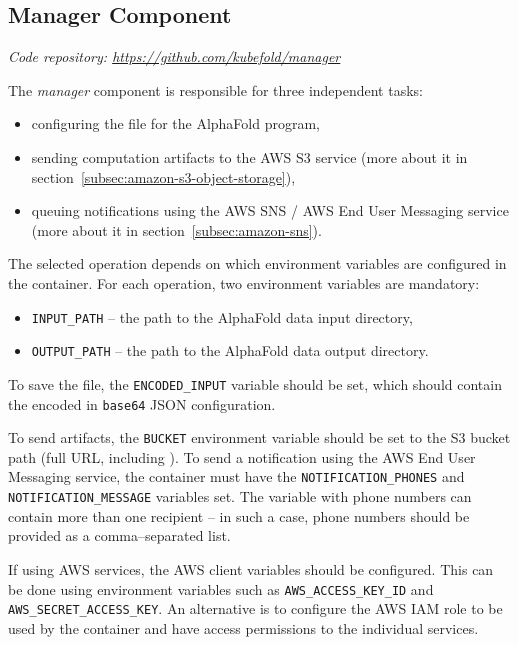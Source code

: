 \subsection{Manager Component}\label{subsec:component-manager}
\textit{Code repository: \url{https://github.com/kubefold/manager}}

The \textit{manager} component is responsible for three independent tasks:
\begin{itemize}
    \item configuring the  file for the AlphaFold program,
    \item sending computation artifacts to the AWS S3 service (more about it in section~\ref{subsec:amazon-s3-object-storage}),
    \item queuing notifications using the AWS SNS / AWS End User Messaging service (more about it in section~\ref{subsec:amazon-sns}).
\end{itemize}

The selected operation depends on which environment variables are configured in the container.
For each operation, two environment variables are mandatory:
\begin{itemize}
    \item \texttt{INPUT\_PATH} -- the path to the AlphaFold data input directory,
    \item \texttt{OUTPUT\_PATH} -- the path to the AlphaFold data output directory.
\end{itemize}

To save the  file, the \texttt{ENCODED\_INPUT} variable should be set, which should contain the encoded in \texttt{base64} JSON configuration.

To send artifacts, the \texttt{BUCKET} environment variable should be set to the S3 bucket path (full URL, including ).
To send a notification using the AWS End User Messaging service, the container must have the \texttt{NOTIFICATION\_PHONES} and \texttt{NOTIFICATION\_MESSAGE} variables set.
The variable with phone numbers can contain more than one recipient -- in such a case, phone numbers should be provided as a comma--separated list.

If using AWS services, the AWS client variables should be configured.
This can be done using environment variables such as \texttt{AWS\_ACCESS\_KEY\_ID} and \texttt{AWS\_SECRET\_ACCESS\_KEY}.
An alternative is to configure the AWS IAM role to be used by the container and have access permissions to the individual services.